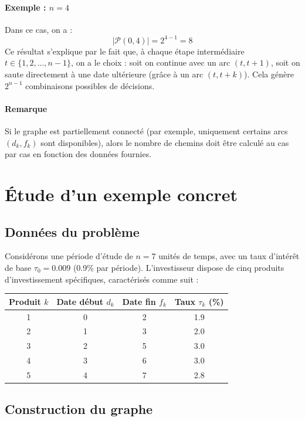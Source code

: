 \documentclass[a4paper,11pt]{article}
\begin{document}
    \paragraph{Exemple : $n = 4$} 
    Dans ce cas, on a :
    \[
    |\mathcal{P}(0, 4)| = 2^{4-1} = 8
    \]
    Ce résultat s’explique par le fait que, à chaque étape intermédiaire $t \in \{1, 2, ..., n-1\}$, on a le choix : soit on continue avec un arc $(t, t+1)$, soit on saute directement à une date ultérieure (grâce à un arc $(t, t+k)$). Cela génère $2^{n-1}$ combinaisons possibles de décisions.

    \paragraph{Remarque} 
    Si le graphe est partiellement connecté (par exemple, uniquement certains arcs $(d_k, f_k)$ sont disponibles), alors le nombre de chemins doit être calculé au cas par cas en fonction des données fournies.


    \section{Étude d’un exemple concret}

    \subsection{Données du problème}

    Considérons une période d’étude de $n = 7$ unités de temps, avec un taux d’intérêt de base $\tau_0 = 0.009$ (0.9\% par période). L’investisseur dispose de cinq produits d’investissement spécifiques, caractérisés comme suit :

    \begin{center}
        \begin{tabular}{|c|c|c|c|}
        \hline
        Produit $k$ & Date début $d_k$ & Date fin $f_k$ & Taux $\tau_k$ (\%) \\
        \hline
        1 & 0 & 2 & 1.9 \\
        2 & 1 & 3 & 2.0 \\
        3 & 2 & 5 & 3.0 \\
        4 & 3 & 6 & 3.0 \\
        5 & 4 & 7 & 2.8 \\
        \hline
        \end{tabular}
    \end{center}

    \subsection{Construction du graphe}
\end{document}
